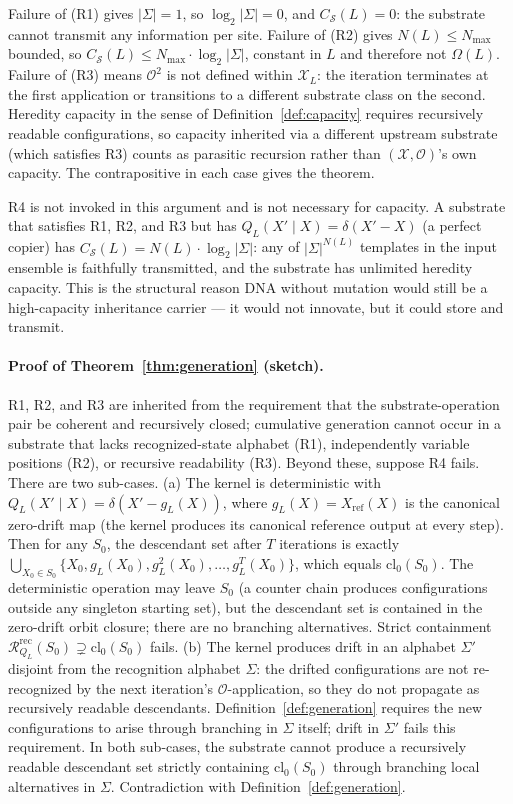 \documentclass[aps,prx,reprint,amsmath,amssymb,floatfix,superscriptaddress,nofootinbib]{revtex4-2}
\theoremstyle{plain-thm}
\theoremstyle{definition-thm}
\newcommand{\Csub}{C_{\mathcal{S}}}
\newcommand{\Xset}{\mathcal{X}}
\newcommand{\Op}{\mathcal{O}}
\begin{document}
Failure of (R1) gives $|\Sigma| = 1$, so $\log_2 |\Sigma| = 0$, and $\Csub(L) = 0$: the substrate cannot transmit any information per site. Failure of (R2) gives $N(L) \le N_{\max}$ bounded, so $\Csub(L) \le N_{\max} \cdot \log_2 |\Sigma|$, constant in $L$ and therefore not $\Omega(L)$. Failure of (R3) means $\Op^2$ is not defined within $\Xset_L$: the iteration terminates at the first application or transitions to a different substrate class on the second. Heredity capacity in the sense of Definition~\ref{def:capacity} requires recursively readable configurations, so capacity inherited via a different upstream substrate (which satisfies R3) counts as parasitic recursion rather than $(\Xset, \Op)$'s own capacity. The contrapositive in each case gives the theorem.

R4 is not invoked in this argument and is not necessary for capacity. A substrate that satisfies R1, R2, and R3 but has $Q_L(X' \mid X) = \delta(X' - X)$ (a perfect copier) has $\Csub(L) = N(L) \cdot \log_2 |\Sigma|$: any of $|\Sigma|^{N(L)}$ templates in the input ensemble is faithfully transmitted, and the substrate has unlimited heredity capacity. This is the structural reason DNA without mutation would still be a high-capacity inheritance carrier --- it would not innovate, but it could store and transmit.

\paragraph{Proof of Theorem~\ref{thm:generation} (sketch).} R1, R2, and R3 are inherited from the requirement that the substrate-operation pair be coherent and recursively closed; cumulative generation cannot occur in a substrate that lacks recognized-state alphabet (R1), independently variable positions (R2), or recursive readability (R3). Beyond these, suppose R4 fails. There are two sub-cases. (a) The kernel is deterministic with $Q_L(X' \mid X) = \delta(X' - g_L(X))$, where $g_L(X) = X_{\mathrm{ref}}(X)$ is the canonical zero-drift map (the kernel produces its canonical reference output at every step). Then for any $S_0$, the descendant set after $T$ iterations is exactly $\bigcup_{X_0 \in S_0} \{X_0, g_L(X_0), g_L^2(X_0), \ldots, g_L^T(X_0)\}$, which equals $\mathrm{cl}_0(S_0)$. The deterministic operation may leave $S_0$ (a counter chain produces configurations outside any singleton starting set), but the descendant set is contained in the zero-drift orbit closure; there are no branching alternatives. Strict containment $\mathcal{R}_{Q_L}^{\mathrm{rec}}(S_0) \supsetneq \mathrm{cl}_0(S_0)$ fails. (b) The kernel produces drift in an alphabet $\Sigma'$ disjoint from the recognition alphabet $\Sigma$: the drifted configurations are not re-recognized by the next iteration's $\Op$-application, so they do not propagate as recursively readable descendants. Definition~\ref{def:generation} requires the new configurations to arise through branching in $\Sigma$ itself; drift in $\Sigma'$ fails this requirement. In both sub-cases, the substrate cannot produce a recursively readable descendant set strictly containing $\mathrm{cl}_0(S_0)$ through branching local alternatives in $\Sigma$. Contradiction with Definition~\ref{def:generation}.
\end{document}
